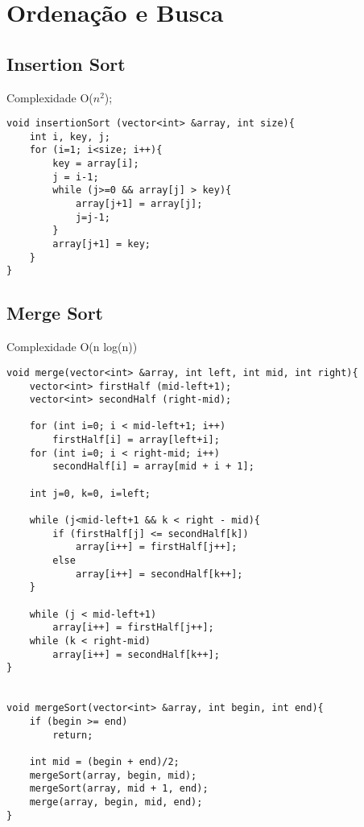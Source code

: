 \section{Ordenação e Busca}

\subsection{Insertion Sort}
Complexidade O($n^2$);
\begin{verbatim}
void insertionSort (vector<int> &array, int size){
    int i, key, j;
    for (i=1; i<size; i++){
        key = array[i];
        j = i-1;
        while (j>=0 && array[j] > key){
            array[j+1] = array[j];
            j=j-1;
        }
        array[j+1] = key;
    }
}
\end{verbatim}

\subsection{Merge Sort}
Complexidade O(n log(n))
\begin{verbatim}
void merge(vector<int> &array, int left, int mid, int right){
    vector<int> firstHalf (mid-left+1);
    vector<int> secondHalf (right-mid);
 
    for (int i=0; i < mid-left+1; i++)  
        firstHalf[i] = array[left+i];
    for (int i=0; i < right-mid; i++)
        secondHalf[i] = array[mid + i + 1];

    int j=0, k=0, i=left; 

    while (j<mid-left+1 && k < right - mid){
        if (firstHalf[j] <= secondHalf[k])
            array[i++] = firstHalf[j++];
        else
            array[i++] = secondHalf[k++];
    }

    while (j < mid-left+1)
        array[i++] = firstHalf[j++];
    while (k < right-mid)
        array[i++] = secondHalf[k++];
}
 

void mergeSort(vector<int> &array, int begin, int end){
    if (begin >= end)
        return;
 
    int mid = (begin + end)/2;
    mergeSort(array, begin, mid);
    mergeSort(array, mid + 1, end);
    merge(array, begin, mid, end);
}
\end{verbatim}

